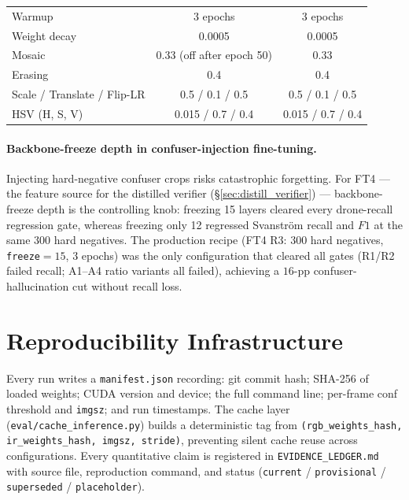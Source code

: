 \begin{table}[htbp]
\begin{tabular}{lcc}
        Warmup            & 3 epochs                   & 3 epochs                                    \\
        Weight decay      & 0.0005                     & 0.0005                                      \\
        Mosaic            & 0.33 (off after epoch 50)  & 0.33                                        \\
        Erasing           & 0.4                        & 0.4                                         \\
        Scale / Translate / Flip-LR & 0.5 / 0.1 / 0.5  & 0.5 / 0.1 / 0.5                             \\
        HSV (H, S, V)     & 0.015 / 0.7 / 0.4          & 0.015 / 0.7 / 0.4                           \\
        \bottomrule
    \end{tabular}
\end{table}

\paragraph{Backbone-freeze depth in confuser-injection fine-tuning.}
Injecting hard-negative confuser crops risks catastrophic forgetting. For FT4 --- the feature source for the distilled verifier (\S\ref{sec:distill_verifier}) --- backbone-freeze depth is the controlling knob: freezing 15 layers cleared every drone-recall regression gate, whereas freezing only 12 regressed Svanstr\"om recall and $F1$ at the same $300$ hard negatives. The production recipe (FT4 R3: $300$ hard negatives, \texttt{freeze}$=15$, $3$ epochs) was the only configuration that cleared all gates (R1/R2 failed recall; A1--A4 ratio variants all failed), achieving a $16$-pp confuser-hallucination cut without recall loss.

\section{Reproducibility Infrastructure}
\label{sec:reproducibility}

Every run writes a \texttt{manifest.json} recording: git commit hash; SHA-256 of loaded weights; CUDA version and device; the full command line; per-frame conf threshold and \texttt{imgsz}; and run timestamps. The cache layer (\texttt{eval/cache\_inference.py}) builds a deterministic tag from \texttt{(rgb\_weights\_hash, ir\_weights\_hash, imgsz, stride)}, preventing silent cache reuse across configurations. Every quantitative claim is registered in \texttt{EVIDENCE\_LEDGER.md} with source file, reproduction command, and status (\texttt{current} / \texttt{provisional} / \texttt{superseded} / \texttt{placeholder}).

